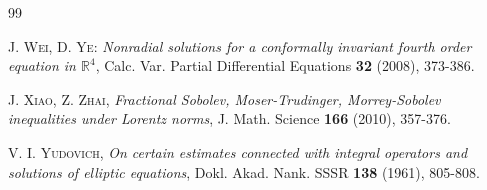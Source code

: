 \documentclass[11pt, a4paper]{article}
\begin{document}
\begin{thebibliography}{99}
\begin{small}
 \textsc{J. Wei, D. Ye:} \emph{Nonradial solutions for a conformally invariant fourth order equation in  $\mathbb{R}^{4}$}, Calc. Var. Partial Differential Equations  \textbf{32} (2008), 373-386.


 \textsc{J. Xiao, Z. Zhai,} \emph{Fractional Sobolev, Moser-Trudinger, Morrey-Sobolev inequalities under Lorentz norms}, J. Math. Science \textbf{166} (2010), 357-376.

 \textsc{V. I. Yudovich}, \emph{On certain estimates connected with integral operators and solutions of elliptic equations}, Dokl. Akad. Nank. SSSR \textbf{138} (1961), 805-808.

\end{small}
\end{thebibliography}
\end{document}
